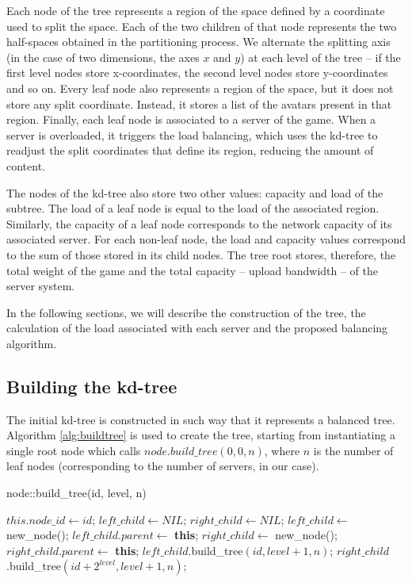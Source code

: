 \documentclass[acmjacm]{acmtrans2m}
\begin{document}
Each node of the tree represents a region of the space defined by a coordinate used to split the space. Each of the two children of that node represents the two half-spaces obtained in the partitioning process. We alternate the splitting axis (in the case of two dimensions, the axes $x$ and $y$) at each level of the tree -- if the first level nodes store x-coordinates, the second level nodes store y-coordinates and so on. Every leaf node also represents a region of the space, but it does not store any split coordinate. Instead, it stores a list of the avatars present in that region. Finally, each leaf node is associated to a server of the game. When a server is overloaded, it triggers the load balancing, which uses the kd-tree to readjust the split coordinates that define its region, reducing the amount of content.

The nodes of the kd-tree also store two other values: capacity and load of the subtree. The load of a leaf node is equal to the load of the associated region. Similarly, the capacity of a leaf node corresponds to the network capacity of its associated server. For each non-leaf node, the load and capacity values correspond to the sum of those stored in its child nodes. The tree root stores, therefore, the total weight of the game and the total capacity -- upload bandwidth -- of the server system.

In the following sections, we will describe the construction of the tree, the calculation of the load associated with each server and the proposed balancing algorithm.

\subsection{Building the kd-tree}

The initial kd-tree is constructed in such way that it represents a balanced tree. Algorithm \ref{alg:buildtree} is used to create the tree, starting from instantiating a single root node which calls $node.build\_tree(0,0,n)$, where $n$ is the number of leaf nodes (corresponding to the number of servers, in our case).

\begin{algorithm}
\caption{node::build\_tree(id, level, n)}
\label{alg:buildtree}
\begin{algorithmic}
 \STATE $this.node\_id \leftarrow id$;
		\STATE $left\_child \leftarrow NIL$;
		\STATE $right\_child \leftarrow NIL$;
	\ELSE
		\STATE $left\_child \leftarrow$ new\_node();
		\STATE $left\_child.parent \leftarrow$ \textbf{this};
		\STATE $right\_child \leftarrow$ new\_node();
		\STATE $right\_child.parent \leftarrow$ \textbf{this};
		\STATE $left\_child$.build\_tree$(id, level + 1, n)$;
		\STATE $right\_child$.build\_tree$(id + 2^{level}, level + 1, n)$;
	\ENDIF
\end{algorithmic}
\end{algorithm}
\end{document}
